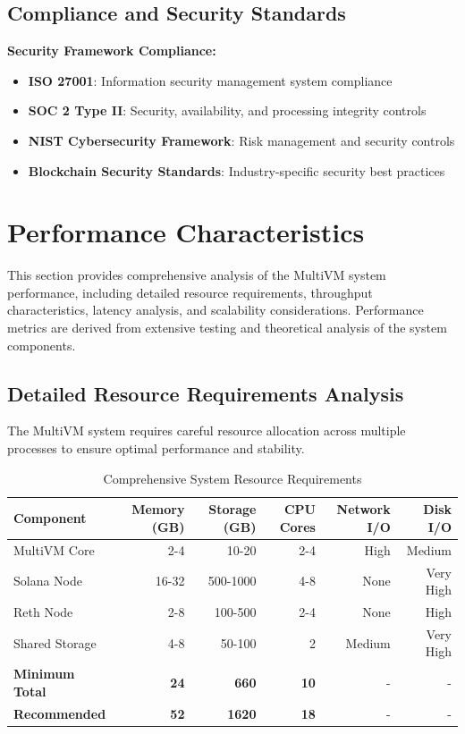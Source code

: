 \documentclass[11pt,a4paper]{article}
\begin{document}
\subsection{Compliance and Security Standards}

\textbf{Security Framework Compliance:}
\begin{itemize}
    \item \textbf{ISO 27001}: Information security management system compliance
    \item \textbf{SOC 2 Type II}: Security, availability, and processing integrity controls
    \item \textbf{NIST Cybersecurity Framework}: Risk management and security controls
    \item \textbf{Blockchain Security Standards}: Industry-specific security best practices
\end{itemize}

\section{Performance Characteristics}

This section provides comprehensive analysis of the MultiVM system performance, including detailed resource requirements, throughput characteristics, latency analysis, and scalability considerations. Performance metrics are derived from extensive testing and theoretical analysis of the system components.

\subsection{Detailed Resource Requirements Analysis}

The MultiVM system requires careful resource allocation across multiple processes to ensure optimal performance and stability.

\begin{table}[H]
\centering
\begin{tabular}{|l|r|r|r|r|r|}
\hline
\textbf{Component} & \textbf{Memory (GB)} & \textbf{Storage (GB)} & \textbf{CPU Cores} & \textbf{Network I/O} & \textbf{Disk I/O} \\
\hline
\hline
MultiVM Core & 2-4 & 10-20 & 2-4 & High & Medium \\
\hline
Solana Node & 16-32 & 500-1000 & 4-8 & None & Very High \\
\hline
Reth Node & 2-8 & 100-500 & 2-4 & None & High \\
\hline
Shared Storage & 4-8 & 50-100 & 2 & Medium & Very High \\
\hline
\hline
\textbf{Minimum Total} & \textbf{24} & \textbf{660} & \textbf{10} & - & - \\
\hline
\textbf{Recommended} & \textbf{52} & \textbf{1620} & \textbf{18} & - & - \\
\hline
\end{tabular}
\caption{Comprehensive System Resource Requirements}
\label{tab:resource-requirements}
\end{table}
\end{document}
